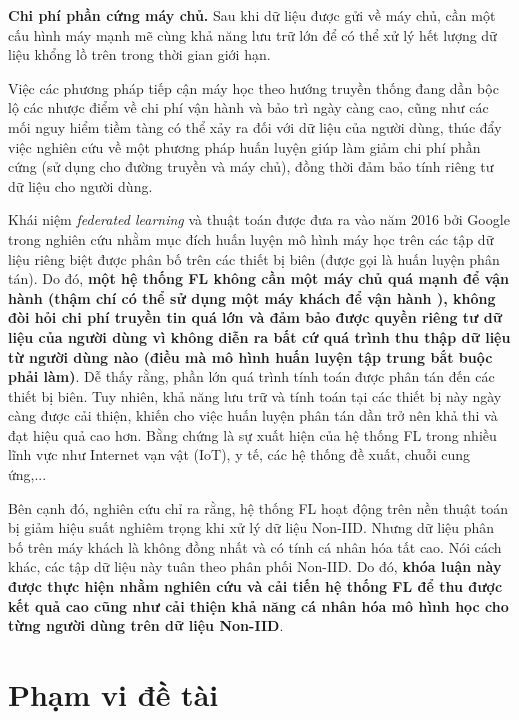 \textbf{Chi phí phần cứng máy chủ.} Sau khi dữ liệu được gửi về máy chủ, cần một cấu hình máy mạnh mẽ cùng khả năng lưu trữ lớn để có thể xử lý hết lượng dữ liệu khổng lồ trên trong thời gian giới hạn.

Việc các phương pháp tiếp cận máy học theo hướng truyền thống đang dần bộc lộ các nhược điểm về chi phí vận hành và bảo trì ngày càng cao, cũng như các mối nguy hiểm tiềm tàng có thể xảy ra đối với dữ liệu của người dùng, thúc đẩy việc nghiên cứu về một phương pháp huấn luyện giúp làm giảm chi phí phần cứng (sử dụng cho đường truyền và máy chủ), đồng thời đảm bảo tính riêng tư dữ liệu cho người dùng.

Khái niệm \textit{federated learning} và thuật toán  được đưa ra vào năm 2016 bởi Google trong nghiên cứu \cite{mcmahan2017communication} nhằm mục đích huấn luyện mô hình máy học trên các tập dữ liệu riêng biệt được phân bố trên các thiết bị biên (được gọi là huấn luyện phân tán). Do đó, \textbf{một hệ thống FL không cần một máy chủ quá mạnh để vận hành (thậm chí có thể sử dụng một máy khách để vận hành \cite{yin2021comprehensive}), không đòi hỏi chi phí truyền tin quá lớn và đảm bảo được quyền riêng tư dữ liệu của người dùng vì không diễn ra bất cứ quá trình thu thập dữ liệu từ người dùng nào (điều mà mô hình huấn luyện tập trung bắt buộc phải làm)}. Dễ thấy rằng, phần lớn quá trình tính toán được phân tán đến các thiết bị biên. Tuy nhiên, khả năng lưu trữ và tính toán tại các thiết bị này ngày càng được cải thiện, khiến cho việc huấn luyện phân tán dần trở nên khả thi và đạt hiệu quả cao hơn. Bằng chứng là sự xuất hiện của hệ thống FL trong nhiều lĩnh vực như Internet vạn vật (IoT), y tế, các hệ thống đề xuất, chuỗi cung ứng,... \cite{zhou2021survey}

Bên cạnh đó, nghiên cứu \cite{zhao2018federated} chỉ ra rằng, hệ thống FL hoạt động trên nền thuật toán  bị giảm hiệu suất nghiêm trọng khi xử lý dữ liệu Non-IID. Nhưng dữ liệu phân bố trên máy khách là không đồng nhất và có tính cá nhân hóa tất cao. Nói cách khác, các tập dữ liệu này tuân theo phân phối Non-IID. Do đó, \textbf{khóa luận này được thực hiện nhằm nghiên cứu và cải tiến hệ thống FL để thu được kết quả cao cũng như cải thiện khả năng cá nhân hóa mô hình học cho từng người dùng trên dữ liệu Non-IID}.

\section{Phạm vi đề tài}


